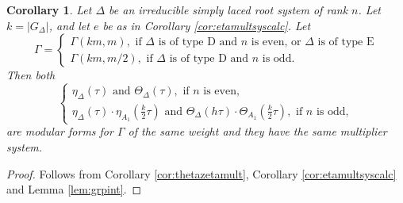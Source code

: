 \documentclass[11pt,a4paper]{amsart}
\newtheorem{corollary}[theorem]{Corollary}
\theoremstyle{definition}
\begin{document}
\begin{corollary} Let $\Delta$ be an irreducible simply laced root system of rank $n$. Let $k=|G_{\Delta}|$, and let $e$ be as in Corollary \ref{cor:etamultsyscalc}. 
Let \[\Gamma=\begin{cases}
\Gamma(km,m), \textrm{ if } \Delta \textrm{ is of type D and } n \textrm{ is even, or } \Delta \textrm{ is of type E} \\
\Gamma(km,m/2), \textrm{ if } \Delta \textrm{ is of type D and } n \textrm{ is odd}.
\end{cases}\]
Then both
\[
\begin{cases}
\eta_{\Delta}(\tau) \textrm{ and }\Theta_{\Delta}(\tau), \textrm{ if } n \textrm{ is even}, \\
\eta_{\Delta}(\tau) \cdot \eta_{A_1}(\frac{k}{2}\tau) \textrm{ and }\Theta_{\Delta}(h\tau) \cdot \Theta_{A_1}(\frac{k}{2}\tau), \textrm{ if } n \textrm{ is odd},
\end{cases}
\]
are modular forms for $\Gamma$ of the same weight and they have the same multiplier system.
\label{cor:etathetamod}
\end{corollary}
\begin{proof}
Follows from Corollary \ref{cor:thetazetamult}, Corollary \ref{cor:etamultsyscalc} and Lemma \ref{lem:grpint}.
\end{proof}



\end{document}
